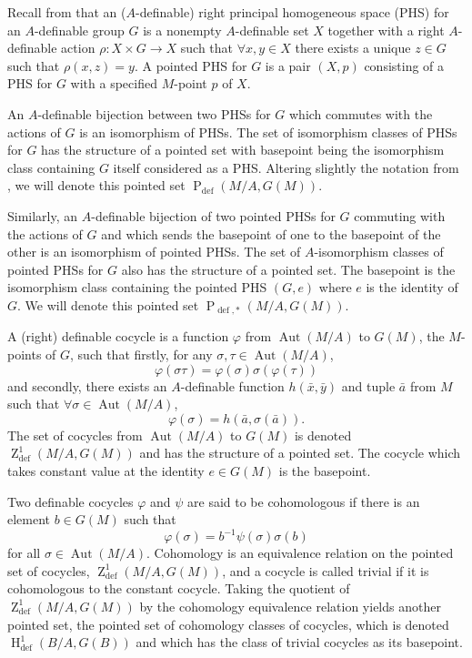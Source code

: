 \documentclass{article}
\theoremstyle{problemstyle}
\DeclareMathOperator{\defin}{def} %
\DeclareMathOperator{\aut}{Aut} %
\DeclareMathOperator{\HH}{H} %
\DeclareMathOperator{\ZZ}{Z} %
\DeclareMathOperator{\PP}{P} %
\begin{document}
Recall from \cite{pillay_1997} that an ($A$-definable) right principal homogeneous space (PHS) for an $A$-definable group $G$ is a nonempty $A$-definable set $X$ together with a right $A$-definable action $\rho:X \times G \to X$ such that $\forall x,y \in X$ there exists a unique $z \in G$ such that $\rho(x,z) = y$. A pointed PHS for $G$ is a pair $(X,p)$ consisting of a PHS for $G$ with a specified $M$-point $p$ of $X$. 

An $A$-definable bijection between two PHSs for $G$ which commutes with the actions of $G$ is an isomorphism of PHSs. The set of isomorphism classes of PHSs for $G$ has the structure of a pointed set with basepoint being the isomorphism class containing $G$ itself considered as a PHS. Altering slightly the notation from \cite{pillay_1997}, we will denote this pointed set $\PP_{\defin}(M/A,G(M))$. 

Similarly, an $A$-definable bijection of two pointed PHSs for $G$ commuting with the actions of $G$ and which sends the basepoint of one to the basepoint of the other is an isomorphism of pointed PHSs. The set of $A$-isomorphism classes of pointed PHSs for $G$ also has the structure of a pointed set. The basepoint is the isomorphism class containing the pointed PHS $(G,e)$ where $e$ is the identity of $G$. We will denote this pointed set $\PP_{\defin,*}(M/A,G(M))$.

A (right) definable cocycle is a function $\varphi$ from $\aut(M/A)$ to $G(M)$, the $M$-points of $G$, such that  firstly, for any $\sigma, \tau \in \aut(M/A)$, $$\varphi(\sigma\tau) = \varphi(\sigma)\sigma(\varphi(\tau))$$ and secondly, there exists an $A$-definable function $h(\bar{x},\bar{y})$ and tuple $\bar{a}$ from $M$ such that $\forall \sigma \in \aut(M/A)$, $$\varphi(\sigma) = h(\bar{a},\sigma(\bar{a})).$$ The set of cocycles from $\aut(M/A)$ to $G(M)$ is denoted $\ZZ^1_{\defin}(M/A,G(M))$ and has the structure of a pointed set. The cocycle which takes constant value at the identity $e \in G(M)$ is the basepoint. 

Two definable cocycles $\varphi$ and $\psi$ are said to be cohomologous if there is an element $b \in G(M)$ such that  $$\varphi(\sigma) = b^{-1}\psi(\sigma)\sigma(b)$$ for all $\sigma \in \aut(M/A)$. Cohomology is an equivalence relation on the pointed set of cocycles, $\ZZ^1_{\defin}(M/A,G(M))$, and a cocycle is called trivial if it is cohomologous to the constant cocycle. Taking the quotient of $\ZZ^1_{\defin}(M/A,G(M))$ by the cohomology equivalence relation yields another pointed set, the pointed set of cohomology classes of cocycles, which is denoted $\HH^1_{\defin}(B/A,G(B))$ and which has the class of trivial cocycles as its basepoint.\\ 
\end{document}
